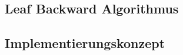 \subsection{Leaf Backward Algorithmus}
\label{sec2:methoden}
%
%
%
%
%
%
%
% 
%
%
%
%
%
%
%
\subsection{Implementierungskonzept}
\label{sec:2methoden}

%
%
%
%  
%
%
%
